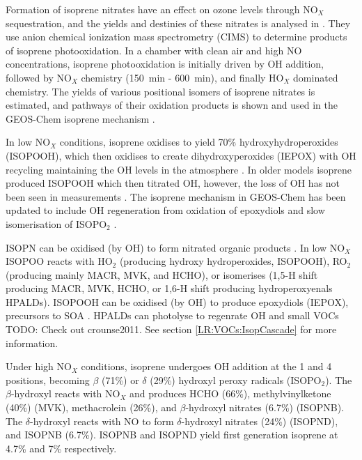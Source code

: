       Formation of isoprene nitrates have an effect on ozone levels through NO$_X$ sequestration, and the yields and destinies of these nitrates is analysed in \textcite{Paulot2009a}. 
      They use anion chemical ionization mass spectrometry (CIMS) to determine products of isoprene photooxidation.
      In a chamber with clean air and high NO concentrations, isoprene photooxidation is initially driven by OH addition, followed by NO$_X$ chemistry (150~min - 600~min), and finally HO$_X$ dominated chemistry.
      The yields of various positional isomers of isoprene nitrates is estimated, and pathways of their oxidation products is shown and used in the GEOS-Chem isoprene mechanism \parencite{Paulot2009a,Mao2013}. 
      
      In low NO$_X$ conditions, isoprene oxidises to yield 70\% hydroxyhydroperoxides (ISOPOOH), which then oxidises to create dihydroxyperoxides (IEPOX) with OH recycling maintaining the OH levels in the atmosphere \parencite{Paulot2009b}.
      In older models isoprene produced ISOPOOH which then titrated OH, however, the loss of OH has not been seen in measurements \parencite{Paulot2009b,Mao2013}.
      The isoprene mechanism in GEOS-Chem has been updated to include OH regeneration from oxidation of epoxydiols and slow isomerisation of ISOPO$_2$ \parencite{Mao2013}.
      
      ISOPN can be oxidised (by OH) to form nitrated organic products \parencite{Paulot2009a}.
      In low NO$_X$ ISOPOO reacts with HO$_2$ (producing hydroxy hydroperoxides, ISOPOOH), RO$_2$ (producing mainly MACR, MVK, and HCHO), or isomerises (1,5-H shift producing MACR, MVK, HCHO, or 1,6-H shift producing hydroperoxyenals HPALDs). 
      ISOPOOH can be oxidised (by OH) to produce epoxydiols (IEPOX), precursors to SOA \parencite{Paulot2009b}. 
      HPALDs can photolyse to regenrate OH and small VOCs \parencite{Crounse2011,Wolfe2012, Peeters2014} TODO: Check out crounse2011.
      See section \ref{LR:VOCs:IsopCascade} for more information.
      
      Under high NO$_X$ conditions, isoprene undergoes OH addition at the 1 and 4 positions, becoming $\beta$ (71\%) or $\delta$ (29\%) hydroxyl peroxy radicals (ISOPO$_2$). 
      The $\beta$-hydroxyl reacts with NO$_X$ and produces HCHO (66\%), methylvinylketone (40\%) (MVK), methacrolein (26\%), and $\beta$-hydroxyl nitrates (6.7\%) (ISOPNB).
      The $\delta$-hydroxyl reacts with NO to form $\delta$-hydroxyl nitrates (24\%) (ISOPND), and ISOPNB (6.7\%).
      ISOPNB and ISOPND yield first generation isoprene at 4.7\% and 7\% respectively.
      
